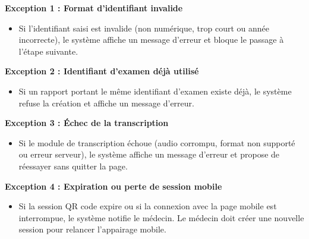 \documentclass[11pt]{article}
\begin{document}
\begin{description}[leftmargin=4.2cm, style=nextline]
    \item[Exceptions]
    \textbf{Exception 1 : Format d'identifiant invalide}
    \begin{itemize}[leftmargin=*, nosep]
        \item Si l'identifiant saisi est invalide (non numérique, trop court ou année incorrecte),
              le système affiche un message d'erreur et bloque le passage à l'étape suivante.
    \end{itemize}
    \textbf{Exception 2 : Identifiant d'examen déjà utilisé}
    \begin{itemize}[leftmargin=*, nosep]
        \item Si un rapport portant le même identifiant d'examen existe déjà,
              le système refuse la création et affiche un message d'erreur.
    \end{itemize}
    \textbf{Exception 3 : Échec de la transcription}
    \begin{itemize}[leftmargin=*, nosep]
        \item Si le module de transcription échoue (audio corrompu, format non supporté ou erreur serveur),
              le système affiche un message d'erreur et propose de réessayer sans quitter la page.
    \end{itemize}
    \textbf{Exception 4 : Expiration ou perte de session mobile}
    \begin{itemize}[leftmargin=*, nosep]
        \item Si la session QR code expire ou si la connexion avec la page mobile est interrompue,
              le système notifie le médecin. Le médecin doit créer une nouvelle session
              pour relancer l'appairage mobile.
    \end{itemize}
\end{description}
\end{document}
